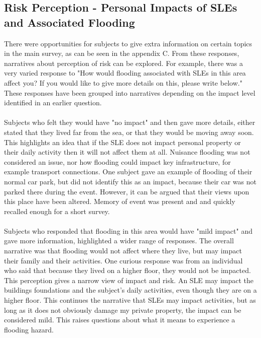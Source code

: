 \subsection{Risk Perception - Personal Impacts of SLEs and Associated Flooding}
There were opportunities for subjects to give extra information on certain topics in the main survey, as can be seen in the appendix C. From these responses, narratives about perception of risk can be explored. For example, there was a very varied response to "How would flooding associated with SLEs in this area affect you? If you would like to give more details on this, please write below." These responses have been grouped into narratives depending on the impact level identified in an earlier question. 
\paragraph{}

Subjects who felt they would have "no impact" and then gave more details, either stated that they lived far from the sea, or that they would be moving away soon. This highlights an idea that if the SLE does not impact personal property or their daily activity then it will not affect them at all. Nuisance flooding was not considered an issue, nor how flooding could impact key infrastructure, for example transport connections. One subject gave an example of flooding of their normal car park, but did not identify this as an impact, because their car was not parked there during the event. However, it can be argued that their views upon this place have been altered. Memory of event was present and and quickly recalled enough for a short survey.  
\paragraph{}

Subjects who responded that flooding in this area would have "mild impact" and gave more information, highlighted a wider range of responses. The overall narrative was that flooding would not affect where they live, but may impact their family and their activities. One curious response was from an individual who said that because they lived on a higher floor, they would not be impacted. This perception gives a narrow view of impact and risk. An SLE may impact the buildings foundations and the subject's daily activities, even though they are on a higher floor. This continues the narrative that SLEs may impact activities, but as long as it does not obviously damage my private property, the impact can be considered mild. This raises questions about what it means to experience a flooding hazard. 
